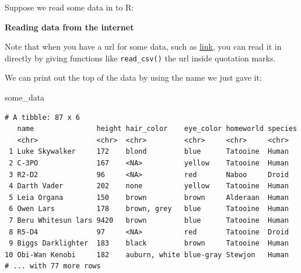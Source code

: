\documentclass[]{book}
\newenvironment{Shaded}{\begin{snugshade}}{\end{snugshade}}
\newcommand{\DecValTok}[1]{\textcolor[rgb]{0.00,0.00,0.81}{#1}}
\newcommand{\KeywordTok}[1]{\textcolor[rgb]{0.13,0.29,0.53}{\textbf{#1}}}
\newcommand{\NormalTok}[1]{#1}
\newcommand{\OperatorTok}[1]{\textcolor[rgb]{0.81,0.36,0.00}{\textbf{#1}}}
\newcommand{\OtherTok}[1]{\textcolor[rgb]{0.56,0.35,0.01}{#1}}
\newcommand{\StringTok}[1]{\textcolor[rgb]{0.31,0.60,0.02}{#1}}
\begin{document}
Suppose we read some data in to R:

\begin{Shaded}
\end{Shaded}

\textbf{Reading data from the internet}

Note that when you have a url for some data, such as \href{url}{link}, you can read it in directly by giving functions like \texttt{read\_csv()} the url inside quotation marks.

We can print out the top of the data by using the name we just gave it:

\begin{Shaded}
\begin{Highlighting}[]
\NormalTok{some_data}
\end{Highlighting}
\end{Shaded}

\begin{verbatim}
# A tibble: 87 x 6
   name               height hair_color    eye_color homeworld species
   <chr>              <chr>  <chr>         <chr>     <chr>     <chr>  
 1 Luke Skywalker     172    blond         blue      Tatooine  Human  
 2 C-3PO              167    <NA>          yellow    Tatooine  Human  
 3 R2-D2              96     <NA>          red       Naboo     Droid  
 4 Darth Vader        202    none          yellow    Tatooine  Human  
 5 Leia Organa        150    brown         brown     Alderaan  Human  
 6 Owen Lars          178    brown, grey   blue      Tatooine  Human  
 7 Beru Whitesun lars 9420   brown         blue      Tatooine  Human  
 8 R5-D4              97     <NA>          red       Tatooine  Droid  
 9 Biggs Darklighter  183    black         brown     Tatooine  Human  
10 Obi-Wan Kenobi     182    auburn, white blue-gray Stewjon   Human  
# ... with 77 more rows
\end{verbatim}
\end{document}
